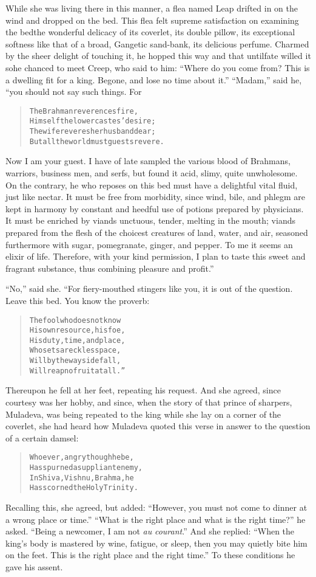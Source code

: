 \documentclass[article, twoside, 14pt]{memoir}
\renewenvironment{verbatim}{%
\begin{quote}%
\vskip -10pt%
\begin{alltt}\normalfont\large}{\end{alltt}%
\end{quote}%
\vskip -10pt
} %
\begin{document}
While she was living there in this manner, a flea named Leap
drifted in on the wind and dropped on the bed. This flea felt
supreme satisfaction on examining the bed{\textemdash}the wonderful delicacy
of its coverlet, its double pillow, its exceptional softness like
that of a broad, Gangetic sand-bank, its delicious perfume. Charmed
by the sheer delight of touching it, he hopped this way and that
until{\textemdash}fate willed it so{\textemdash}he chanced to meet Creep, who said to
him:
``Where do you come from? This is a dwelling fit for a king. Begone, and lose no time about it.''
``Madam,'' said he, “you should not say such things. For

\begin{verbatim}
The Brahman reverences fire,
Himself the lower castes' desire;
The wife reveres her husband dear;
But all the world must guests revere.
\end{verbatim}
Now I am your guest. I have of late sampled the various blood of
Brahmans, warriors, business men, and serfs, but found it acid,
slimy, quite unwholesome. On the contrary, he who reposes on this
bed must have a delightful vital fluid, just like nectar. It must
 be free from morbidity, since wind, bile, and phlegm are kept
in harmony by constant and heedful use of potions prepared by
physicians. It must be enriched by viands unctuous, tender, melting
in the mouth; viands prepared from the flesh of the choicest
creatures of land, water, and air, seasoned furthermore with sugar,
pomegranate, ginger, and pepper. To me it seems an elixir of life.
Therefore, with your kind permission, I plan to taste this sweet
and fragrant substance, thus combining pleasure and profit.”

``No,'' said she. “For fiery-mouthed stingers like you, it is out
of the question. Leave this bed. You know the proverb:

\begin{verbatim}
The fool who does not know
His own resource, his foe,
His duty, time, and place,
Who sets a reckless pace,
Will by the wayside fall,
Will reap no fruit at all.”
\end{verbatim}
Thereupon he fell at her feet, repeating his request. And she
agreed, since courtesy was her hobby, and since, when the story of
that prince of sharpers, Muladeva, was being repeated to the king
while she lay on a corner of the coverlet, she had heard how
Muladeva quoted this verse in answer to the question of a certain
damsel:

\begin{verbatim}
Whoever, angry though he be,
Has spurned a suppliant enemy,
In Shiva, Vishnu, Brahma, he
Has scorned the Holy Trinity.
\end{verbatim}
Recalling this, she agreed, but added:
``However, you must not come to dinner at a wrong place or time.''
``What is the right place and what is the right time?'' he asked.
``Being a newcomer, I am not \emph{au} \emph{courant}.'' And she
replied:
``When the king's body is mastered by wine, fatigue, or sleep, then you may quietly bite him on the feet. This is the right place and the right time.''
To these conditions he gave his assent.
\end{document}
